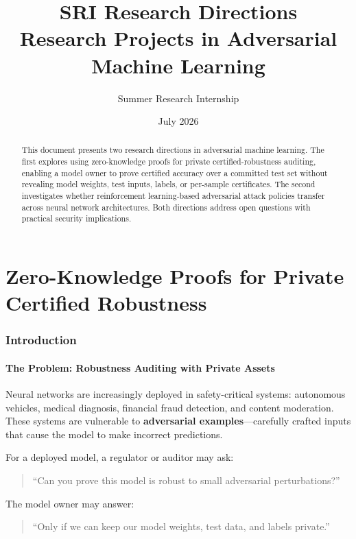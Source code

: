 \documentclass[11pt,a4paper]{article}
\title{\textbf{SRI Research Directions}\\[0.5em]
\large Research Projects in Adversarial Machine Learning}
\author{Summer Research Internship}
\date{July 2026}
\begin{document}
\maketitle

\begin{abstract}
This document presents two research directions in adversarial machine learning. The first explores using zero-knowledge proofs for private certified-robustness auditing, enabling a model owner to prove certified accuracy over a committed test set without revealing model weights, test inputs, labels, or per-sample certificates. The second investigates whether reinforcement learning-based adversarial attack policies transfer across neural network architectures. Both directions address open questions with practical security implications.
\end{abstract}

\tableofcontents
\newpage

\part{Zero-Knowledge Proofs for Private Certified Robustness}

\section{Introduction}

\subsection{The Problem: Robustness Auditing with Private Assets}

Neural networks are increasingly deployed in safety-critical systems: autonomous vehicles, medical diagnosis, financial fraud detection, and content moderation. These systems are vulnerable to \textbf{adversarial examples}---carefully crafted inputs that cause the model to make incorrect predictions.

For a deployed model, a regulator or auditor may ask:
\begin{quote}
``Can you prove this model is robust to small adversarial perturbations?''
\end{quote}

The model owner may answer:
\begin{quote}
``Only if we can keep our model weights, test data, and labels private.''
\end{quote}
\end{document}
